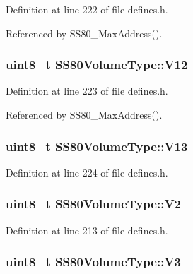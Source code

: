 Definition at line 222 of file defines.\+h.



Referenced by S\+S80\+\_\+\+Max\+Address().

\subsubsection[{\texorpdfstring{V12}{V12}}]{\setlength{\rightskip}{0pt plus 5cm}uint8\+\_\+t S\+S80\+Volume\+Type\+::\+V12}\hypertarget{structSS80VolumeType_a28e1a9ed69ffd15b93665cc228f292ae}{}\label{structSS80VolumeType_a28e1a9ed69ffd15b93665cc228f292ae}


Definition at line 223 of file defines.\+h.



Referenced by S\+S80\+\_\+\+Max\+Address().

\subsubsection[{\texorpdfstring{V13}{V13}}]{\setlength{\rightskip}{0pt plus 5cm}uint8\+\_\+t S\+S80\+Volume\+Type\+::\+V13}\hypertarget{structSS80VolumeType_a07df35f7acf6e018789c9fa0e4986665}{}\label{structSS80VolumeType_a07df35f7acf6e018789c9fa0e4986665}


Definition at line 224 of file defines.\+h.

\subsubsection[{\texorpdfstring{V2}{V2}}]{\setlength{\rightskip}{0pt plus 5cm}uint8\+\_\+t S\+S80\+Volume\+Type\+::\+V2}\hypertarget{structSS80VolumeType_ad0c6f3af1c94d925d5e297252a5f22af}{}\label{structSS80VolumeType_ad0c6f3af1c94d925d5e297252a5f22af}


Definition at line 213 of file defines.\+h.

\subsubsection[{\texorpdfstring{V3}{V3}}]{\setlength{\rightskip}{0pt plus 5cm}uint8\+\_\+t S\+S80\+Volume\+Type\+::\+V3}\hypertarget{structSS80VolumeType_a968e3149dd6956c2305fb89b182be16e}{}\label{structSS80VolumeType_a968e3149dd6956c2305fb89b182be16e}


